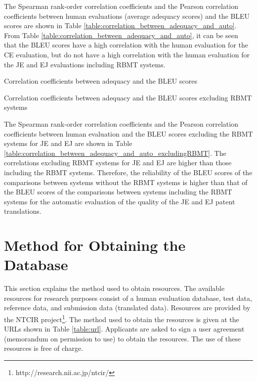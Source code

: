 \documentclass[english]{jnlp_1.4}
\begin{document}
The Spearman rank-order correlation coefficients and the Pearson correlation coefficients between human evaluations (average adequacy scores) and the BLEU scores are shown in Table \ref{table:correlation_between_adequacy_and_auto}.
From Table \ref{table:correlation_between_adequacy_and_auto}, it can be seen that the BLEU scores have a high correlation with the human evaluation for the CE evaluation, but do not have a high correlation with the human evaluation for the JE and EJ evaluations including RBMT systems.

\begin{table}[t]
\caption{Correlation coefficients between adequacy and the BLEU scores}
\label{table:correlation_between_adequacy_and_auto}

\end{table}
\begin{table}[t]
\caption{Correlation coefficients between adequacy and the BLEU scores excluding RBMT systems}
\label{table:correlation_between_adequacy_and_auto_excludingRBMT}

\end{table}

The Spearman rank-order correlation coefficients and the Pearson correlation coefficients between human evaluation and the BLEU scores excluding the RBMT systems for JE and EJ are shown in Table \ref{table:correlation_between_adequacy_and_auto_excludingRBMT}.
The correlations excluding RBMT systems for JE and EJ are higher than those including the RBMT systems.
Therefore, the reliability of the BLEU scores of the comparisons between systems without the RBMT systems is higher than that of the BLEU scores of the comparisons between systems including the RBMT systems for the automatic evaluation of the quality of the JE and EJ patent translations.


\section{Method for Obtaining the Database}
\label{sec:obtain_method}

This section explains the method used to obtain resources. 
The available resources for research purposes consist of a human evaluation database, test data, reference data, and submission data (translated data). 
Resources are provided by the NTCIR project\footnote{http://research.nii.ac.jp/ntcir/}. 
The method used to obtain the resources is given at the URLs shown in Table \ref{table:url}.
Applicants are asked to sign a user agreement (memorandum on permission to use) to obtain the resources. 
The use of these resources is free of charge. 
\end{document}
